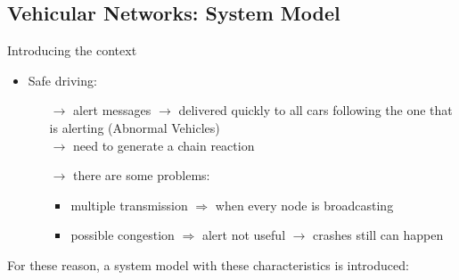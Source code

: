 \subsection{Vehicular Networks: System Model}
Introducing the context
\begin{itemize}
    \item Safe driving:
    \begin{itemize}
        \item[$\rightarrow$] alert messages $\rightarrow$ delivered quickly to all
        cars following the one that is alerting (Abnormal Vehicles)\\
        $\rightarrow$ need to generate a chain reaction
        \item[$\rightarrow$] there are some problems:
        \begin{itemize}
            \item multiple transmission $\Rightarrow$ when every node is broadcasting
            \item possible congestion $\Rightarrow$ alert not useful $\rightarrow$ crashes
            still can happen
        \end{itemize}
    \end{itemize}
\end{itemize}
For these reason, a system model with these characteristics is introduced:
